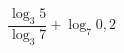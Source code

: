 \begin{ex}
	\begin{condition}
		\( \dfrac{\log_3 5}{\log_3 7}+\log_7 0,2 \)
	\end{condition}
\end{ex}